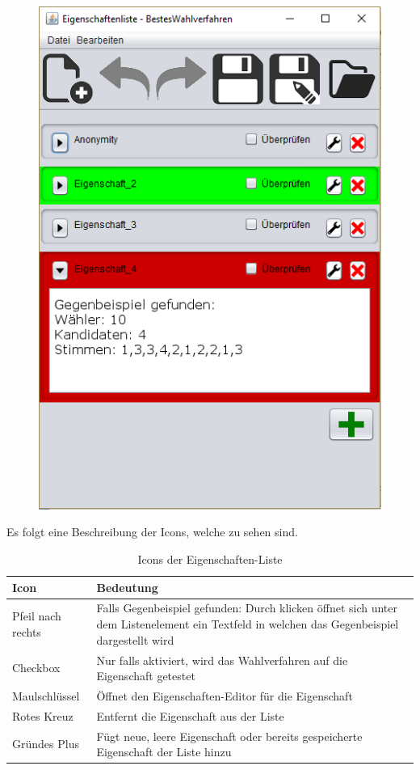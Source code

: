 \documentclass[a4paper]{scrreprt}
\begin{document}
\begin{figure}[H]
\begin{minipage}{.5\textwidth}
  \includegraphics[scale=0.5]{gegenbeispiel.png}
  \label{fig:sub2}
\end{minipage}
\end{figure}

Es folgt eine Beschreibung der Icons, welche zu sehen sind.

\begin{table}[H]
\begin{tabular}{|p{3cm}|p{12cm}|}
Icon & Bedeutung \\
\hline
Pfeil nach rechts & Falls Gegenbeispiel gefunden: Durch klicken öffnet sich unter dem Listenelement ein Textfeld in welchen das Gegenbeispiel dargestellt wird \\
Checkbox & Nur falls aktiviert, wird das Wahlverfahren auf die Eigenschaft getestet \\
Maulschlüssel & Öffnet den Eigenschaften-Editor für die Eigenschaft\\
Rotes Kreuz & Entfernt die Eigenschaft aus der Liste \\
Gründes Plus & Fügt neue, leere Eigenschaft oder bereits gespeicherte Eigenschaft der Liste hinzu
\end{tabular}
\label{Eigenschaftenliste-Bearbeiten-Menüpunkte}
\caption{Icons der Eigenschaften-Liste}
\end{table}
\end{document}
